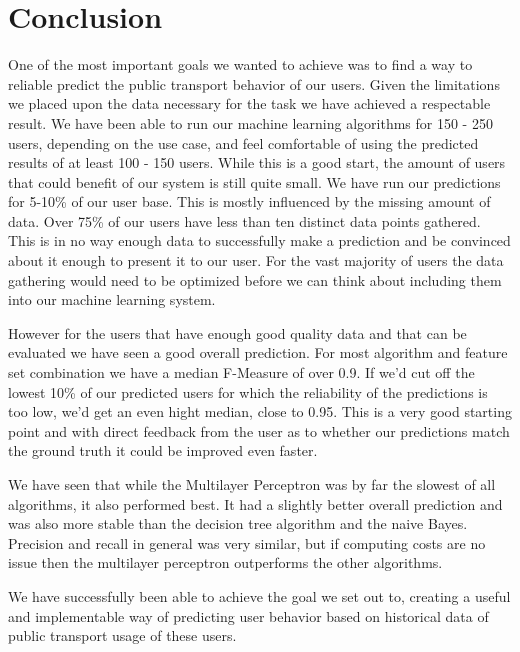 \newpage
\chapter{Conclusion}

One of the most important goals we wanted to achieve was to find a way to reliable predict the public transport behavior of our users. Given the limitations we placed upon the data necessary for the task we have achieved a respectable result. We have been able to run our machine learning algorithms for 150 - 250 users, depending on the use case, and feel comfortable of using the predicted results of at least 100 - 150 users. While this is a good start, the amount of users that could benefit of our system is still quite small. We have run our predictions for 5-10\% of our user base. This is mostly influenced by the missing amount of data. Over 75\% of our users have less than ten distinct data points gathered. This is in no way enough data to successfully make a prediction and be convinced about it enough to present it to our user. For the vast majority of users the data gathering would need to be optimized before we can think about including them into our machine learning system.

However for the users that have enough good quality data and that can be evaluated we have seen a good overall prediction. For most algorithm and feature set combination we have a median F-Measure of over 0.9. If we'd cut off the lowest 10\% of our predicted users for which the reliability of the predictions is too low, we'd get an even hight median, close to 0.95. This is a very good starting point and with direct feedback from the user as to whether our predictions match the ground truth it could be improved even faster.

We have seen that while the Multilayer Perceptron was by far the slowest of all algorithms, it also performed best. It had a slightly better overall prediction and was also more stable than the decision tree algorithm and the naive Bayes. Precision and recall in general was very similar, but if computing costs are no issue then the multilayer perceptron outperforms the other algorithms.

We have successfully been able to achieve the goal we set out to, creating a useful and implementable way of predicting user behavior based on historical data of public transport usage of these users.